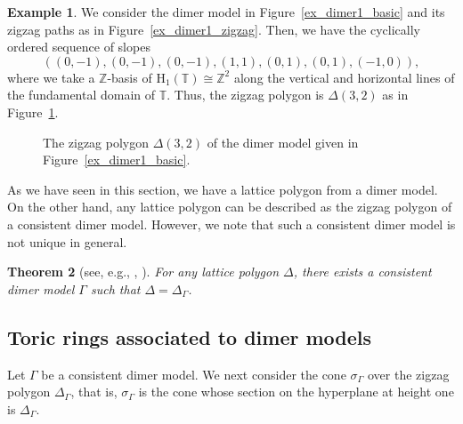 \documentclass[10pt,a4paper]{amsart}
\numberwithin{equation}{section}
\newtheorem{Theorem}{Theorem}[section]
\theoremstyle{definition}
\newtheorem{Example}[Theorem]{Example}
\newcommand{\ZZ}{\mathbb{Z}}
\newcommand{\TT}{\mathbb{T}}
\newcommand{\rmH}{\mathrm{H}}
\begin{document}
\begin{Example}
We consider the dimer model in Figure~\ref{ex_dimer1_basic} and its zigzag paths as in Figure~\ref{ex_dimer1_zigzag}.
Then, we have the cyclically ordered sequence of slopes
\[
((0,-1), (0,-1), (0,-1), (1,1), (0,1), (0,1), (-1,0)),
\]
where we take a $\ZZ$-basis of $\rmH_1(\TT)\cong\ZZ^2$ along the vertical and horizontal lines of the fundamental domain of $\TT$.
Thus, the zigzag polygon is $\Delta(3,2)$ as in Figure~\ref{ex_zigzagpolygon1}.

\begin{figure}[!ht]
\centering
{}

\vspace{-2mm}

\caption{The zigzag polygon $\Delta(3,2)$ of the dimer model given in Figure~\ref{ex_dimer1_basic}.}\label{ex_zigzagpolygon1}
\end{figure}
\end{Example}

As we have seen in this section, we have a lattice polygon from a dimer model.
On the other hand, any lattice polygon can be described as the zigzag polygon of a consistent dimer model.
However, we note that such a consistent dimer model is not unique in general.

\begin{Theorem}[{see, e.g., \cite[Theorem~6.1]{Gul}, \cite[Corollary~1.2]{IU_special}}]
\label{exist_dimer}
For any lattice polygon $\Delta$, there exists a consistent dimer model $\Gamma$ such that $\Delta=\Delta_\Gamma$.
\end{Theorem}

\subsection{Toric rings associated to dimer models}\label{subsec_toric}

Let $\Gamma$ be a consistent dimer model.
We next consider the cone $\sigma_\Gamma$ over the zigzag polygon $\Delta_\Gamma$,
that is, $\sigma_\Gamma$ is the cone whose section on the hyperplane at height one is $\Delta_\Gamma$.
\end{document}
